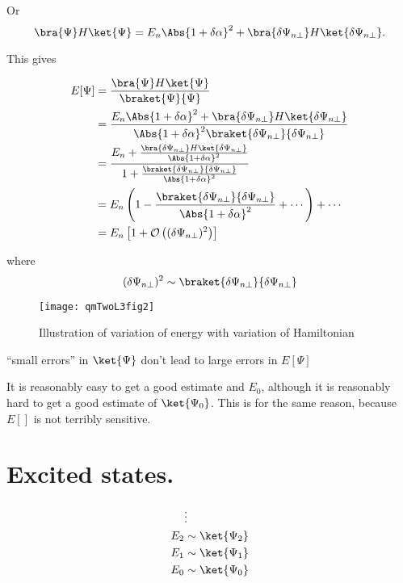 Or
\begin{equation}\label{eqn:qmTwoL3:130}
\bra{\Psi} H \ket{\Psi}
= 
E_n \Abs{1 + \delta \alpha }^2
+
\bra{\delta \Psi_{n \perp}} H \ket{\delta \Psi_{n \perp}}.
\end{equation}

This gives

\begin{align*}
E[\Psi] 
&= 
\frac{
\bra{\Psi} H \ket{\Psi}
}
{
\braket{\Psi}{\Psi}
} \\
&=
\frac{
E_n \Abs{1 + \delta \alpha }^2 + 
\bra{\delta \Psi_{n \perp}} H \ket{\delta \Psi_{n \perp}}
}
{
\Abs{1 + \delta \alpha }^2
\braket{\delta \Psi_{n \perp}}{\delta \Psi_{n \perp}} 
} \\
&=
\frac{
E_n 
+ 
\frac{\bra{\delta \Psi_{n \perp}} H \ket{\delta \Psi_{n \perp}} }
{\Abs{1 + \delta \alpha }^2}
}
{
1
+\frac{\braket{\delta \Psi_{n \perp}}{\delta \Psi_{n \perp}} }
{\Abs{1 + \delta \alpha }^2}
} \\
&=
E_n \left( 1 - 
\frac{\braket{\delta \Psi_{n \perp}}{\delta \Psi_{n \perp}} }
{\Abs{1 + \delta \alpha }^2}
+ \cdots \right) + \cdots \\
&=
E_n\left[1 + \mathcal{O}\left((\delta \Psi_{n \perp})^2\right)\right]
\end{align*}

where
\begin{equation}\label{eqn:qmTwoL3:150}
(\delta \Psi_{n \perp})^2
\sim
\braket{\delta \Psi_{n \perp}}{\delta \Psi_{n \perp}}
\end{equation}

\begin{figure}[htp]
\centering
\texttt{[image: qmTwoL3fig2]}
\caption{Illustration of variation of energy with variation of Hamiltonian}\label{fig:qmTwoL3fig2}
\end{figure}

``small errors'' in $\ket{\Psi}$ don't lead to large errors in $E[\Psi]$

It is reasonably easy to get a good estimate and $E_0$, although it is reasonably hard to get a good estimate of $\ket{\Psi_0}$.  This is for the same reason, because $E[]$ is not terribly sensitive.

\section{Excited states.}

\begin{align*}
&\vdots \\
E_2 &\sim \ket{\Psi_2} \\
E_1 &\sim \ket{\Psi_1} \\
E_0 &\sim \ket{\Psi_0}
\end{align*}

